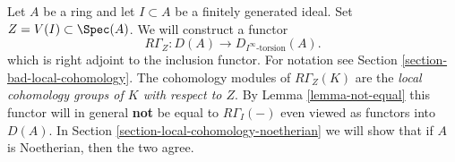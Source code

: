 \noindent
Let $A$ be a ring and let $I \subset A$ be a finitely generated ideal.
Set $Z = V(I) \subset \Spec(A)$. We will construct a functor
\begin{equation}
\label{equation-local-cohomology}
R\Gamma_Z : D(A) \longrightarrow D_{I^\infty\text{-torsion}}(A).
\end{equation}
which is right adjoint to the inclusion functor. For notation
see Section \ref{section-bad-local-cohomology}. The cohomology
modules of $R\Gamma_Z(K)$ are the {\it local cohomology groups
of $K$ with respect to $Z$}.
By Lemma \ref{lemma-not-equal} this functor will in general {\bf not} be
equal to $R\Gamma_I( - )$ even viewed as functors into $D(A)$.
In Section \ref{section-local-cohomology-noetherian}
we will show that if $A$ is Noetherian, then the two agree.